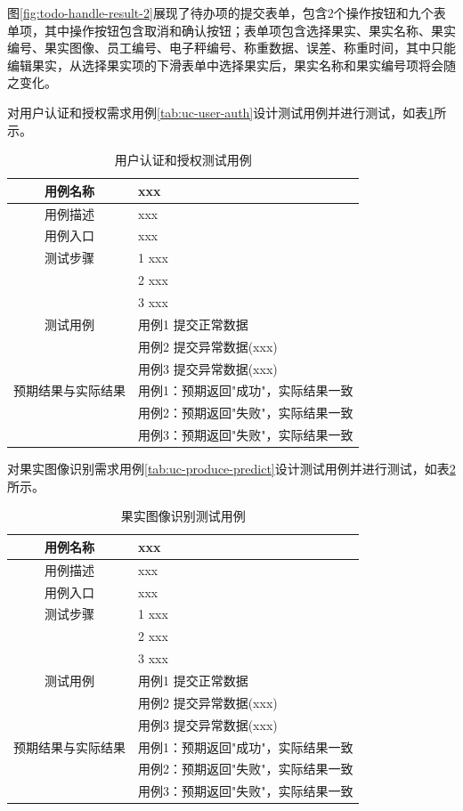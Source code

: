 图\ref{fig:todo-handle-result-2}展现了待办项的提交表单，包含2个操作按钮和九个表单项，其中操作按钮包含取消和确认按钮；表单项包含选择果实、果实名称、果实编号、果实图像、员工编号、电子秤编号、称重数据、误差、称重时间，其中只能编辑果实，从选择果实项的下滑表单中选择果实后，果实名称和果实编号项将会随之变化。

对用户认证和授权需求用例\ref{tab:uc-user-auth}设计测试用例并进行测试，如表\ref{tab:uc-user-auth-test}所示。

\begin{longtable}[ht]{|c|p{8cm}|}
\caption{用户认证和授权测试用例}
\label{tab:uc-user-auth-test}
\\
\hline
用例名称 & xxx \\
\hline
用例描述 & xxx \\
\hline
用例入口 & xxx \\
\hline
测试步骤 & 1 xxx \\
& 2 xxx \\
& 3 xxx \\
\hline
测试用例 & 用例1 提交正常数据 \\
& 用例2 提交异常数据(xxx) \\
& 用例3 提交异常数据(xxx) \\
\hline
预期结果与实际结果 & 用例1：预期返回"成功"，实际结果一致 \\
& 用例2：预期返回"失败"，实际结果一致 \\
& 用例3：预期返回"失败"，实际结果一致 \\
\hline
\end{longtable}

对果实图像识别需求用例\ref{tab:uc-produce-predict}设计测试用例并进行测试，如表\ref{tab:uc-produce-predict-test}所示。

\begin{longtable}[ht]{|c|p{8cm}|}
\caption{果实图像识别测试用例}
\label{tab:uc-produce-predict-test}
\\
\hline
用例名称 & xxx \\
\hline
用例描述 & xxx \\
\hline
用例入口 & xxx \\
\hline
测试步骤 & 1 xxx \\
& 2 xxx \\
& 3 xxx \\
\hline
测试用例 & 用例1 提交正常数据 \\
& 用例2 提交异常数据(xxx) \\
& 用例3 提交异常数据(xxx) \\
\hline
预期结果与实际结果 & 用例1：预期返回"成功"，实际结果一致 \\
& 用例2：预期返回"失败"，实际结果一致 \\
& 用例3：预期返回"失败"，实际结果一致 \\
\hline
\end{longtable}

